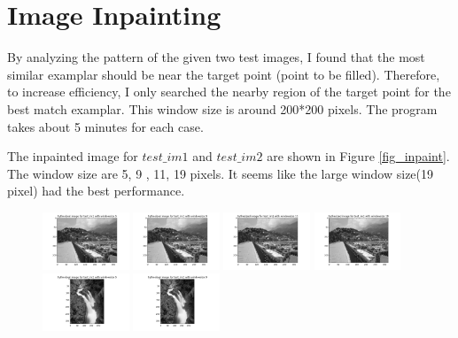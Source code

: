 \documentclass{extarticle}
\theoremstyle{definition}
\theoremstyle{definition}
\begin{document}
\section{Image Inpainting}
By analyzing the pattern of the given two test images, I found that the most similar examplar should be near the target point (point to be filled). Therefore, to increase efficiency, I only searched the nearby region of the target point for the best match examplar. This window size is around 200*200 pixels. The program takes about 5 minutes for each case. 

The inpainted image for $test\_im1$ and $test\_im2$ are shown in Figure \ref{fig_inpaint}. The window size are 5, 9 , 11, 19 pixels. It seems like the large window size(19 pixel) had the best performance. \\
\begin{figure}[h!]
	\includegraphics[width = 0.23\textwidth]{./figures/Inpainting_test_im1_size_5.png}	
	\includegraphics[width = 0.23\textwidth]{./figures/Inpainting_test_im1_size_9.png}	
	\includegraphics[width = 0.23\textwidth]{./figures/Inpainting_test_im1_size_11.png}
	\includegraphics[width = 0.23\textwidth]{./figures/Inpainting_test_im1_size_19.png}
	\includegraphics[width = 0.23\textwidth]{./figures/Inpainting_test_im2_size_5.png}	
	\includegraphics[width = 0.23\textwidth]{./figures/Inpainting_test_im2_size_9.png}	

\end{figure}
\end{document}
